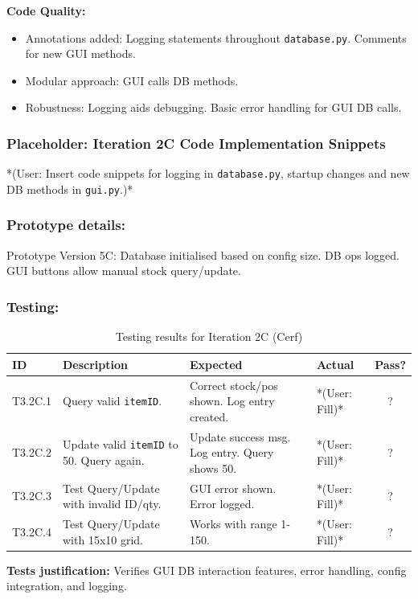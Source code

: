 \textbf{Code Quality:}
\begin{itemize}
	\item Annotations added: Logging statements throughout \verb|database.py|. Comments for new GUI methods.
	\item Modular approach: GUI calls DB methods.
	\item Robustness: Logging aids debugging. Basic error handling for GUI DB calls.
\end{itemize}

\newpage
\subsubsection*{Placeholder: Iteration 2C Code Implementation Snippets}
*(User: Insert code snippets for logging in \verb|database.py|, startup changes and new DB methods in \verb|gui.py|.)*
\newpage

\subsubsection{Prototype details:}
Prototype Version 5C: Database initialised based on config size. DB ops logged. GUI buttons allow manual stock query/update.

\subsubsection{Testing:}
\begin{table}[htbp]
	\centering
	\begin{tabularx}{\textwidth}{|l|X|p{4.5cm}|p{1.5cm}|c|}
		\hline
		\textbf{ID} & \textbf{Description} & \textbf{Expected} & \textbf{Actual} & \textbf{Pass?} \\
		\hline
		T3.2C.1 & Query valid \verb|itemID|. & Correct stock/pos shown. Log entry created. & *(User: Fill)* & ? \\
		\hline
		T3.2C.2 & Update valid \verb|itemID| to 50. Query again. & Update success msg. Log entry. Query shows 50. & *(User: Fill)* & ? \\
		\hline
		T3.2C.3 & Test Query/Update with invalid ID/qty. & GUI error shown. Error logged. & *(User: Fill)* & ? \\
		\hline
		T3.2C.4 & Test Query/Update with 15x10 grid. & Works with range 1-150. & *(User: Fill)* & ? \\
		\hline
	\end{tabularx}
	\caption{Testing results for Iteration 2C (Cerf)}
\end{table}
\textbf{Tests justification:} Verifies GUI DB interaction features, error handling, config integration, and logging.

